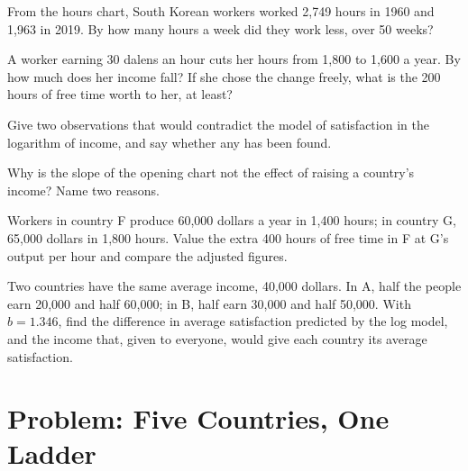 \begin{exercise}[$\star\star$]\label{exo:g12:income-and-wellbeing:10}
From the hours chart, South Korean workers worked 2,749 hours in 1960 and 1,963 in 2019. By how many hours a week did they work less, over 50 weeks?
\end{exercise}

\begin{exercise}[$\star\star$]\label{exo:g12:income-and-wellbeing:11}
A worker earning 30 dalens an hour cuts her hours from 1,800 to 1,600 a year. By how much does her income fall? If she chose the change freely, what is the 200 hours of free
time worth to her, at least?
\end{exercise}

\begin{exercise}[$\star\star\star$]\label{exo:g12:income-and-wellbeing:12}
Give two observations that would contradict the model of satisfaction in the logarithm of income, and say whether any has been found.
\end{exercise}

\begin{exercise}[$\star\star\star$]\label{exo:g12:income-and-wellbeing:13}
Why is the slope of the opening chart not the effect of raising a country's income? Name two reasons.
\end{exercise}

\begin{exercise}[$\star\star\star$]\label{exo:g12:income-and-wellbeing:14}
Workers in country F produce 60,000 dollars a year in 1,400 hours; in country G, 65,000 dollars in 1,800 hours. Value the extra 400 hours of free time in F at G's output per
hour and compare the adjusted figures.
\end{exercise}

\begin{exercise}[$\star\star\star$]\label{exo:g12:income-and-wellbeing:15}
Two countries have the same average income, 40,000 dollars. In A, half the people earn 20,000 and half 60,000; in B, half earn 30,000 and half 50,000. With $b = 1.346$, find
the difference in average satisfaction predicted by the log model, and the income that, given to everyone, would give each country its average satisfaction.
\end{exercise}

\section{Problem: Five Countries, One Ladder}


